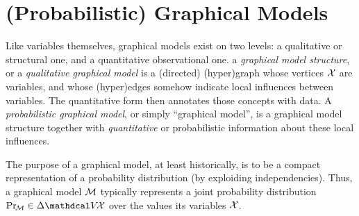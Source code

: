 



\section{(Probabilistic) Graphical Models}
    \label{sec:prelim-pgms}

Like variables themselves, graphical models exist on two levels: a qualitative or structural one, and a quantitative observational one.
%
a \emph{graphical model structure}, or a \emph{qualitative graphical model} is a (directed) (hyper)graph whose vertices $\mathcal X$ are variables, and whose (hyper)edges somehow indicate local influences between variables.
The quantitative form then annotates those concepts with data.
A \emph{probabilistic graphical model},
or simply  ``graphical model'', is a
graphical model structure together with  \emph{quantitative} or probabilistic information about these local influences.

The purpose of a graphical model, at least historically, is to be a compact representation of a probability distribution (by exploiding independencies). 
Thus, a graphical model $\cal M$
typically represents a joint probability distribution $\Pr_{\!\cal M}
 \in \Delta \V\!\X$ over the values its variables $\mathcal X$.

